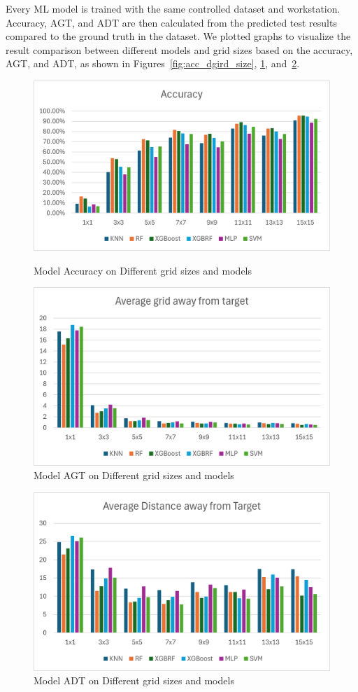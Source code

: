 \documentclass[runningheads]{llncs}
\begin{document}
Every ML model is trained with the same controlled dataset and workstation. Accuracy, AGT, and ADT are then calculated from the predicted test results compared to the ground truth in the dataset. We plotted graphs to visualize the result comparison between different models and grid sizes based on the accuracy, AGT, and ADT, as shown in Figures~\ref{fig:acc_dgird_size}, \ref{fig:AGT_dgrid_size}, and~\ref{fig:ADT_dgrid_size}.

\begin{figure}[thb!]
	\begin{minipage}{0.45\linewidth}
		\centering
		\includegraphics[width=\linewidth]{figures/image3.png}
		\caption{Model Accuracy on Different grid sizes and models}
		\label{fig:acc_dgird_size}
	\end{minipage}
	\hfill
	\begin{minipage}{0.45\linewidth}
		\centering
		\includegraphics[width=\linewidth]{figures/image1.png}
		\caption{Model AGT on Different grid sizes and models}
		\label{fig:AGT_dgrid_size}
	\end{minipage}
\end{figure}
\begin{figure}[thb!]
        \centering
        \includegraphics[width=.45\linewidth]{figures/image2.png}
        \caption{Model ADT on Different grid sizes and models}
        \label{fig:ADT_dgrid_size}
\end{figure}
\end{document}
